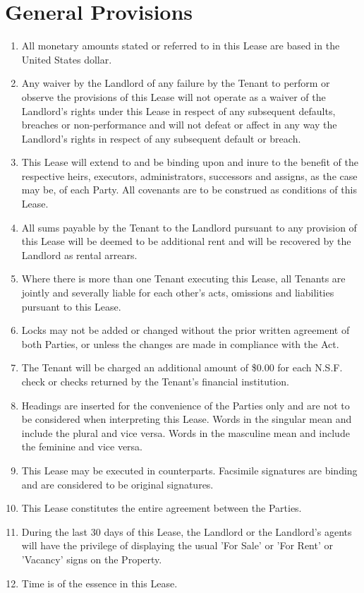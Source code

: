 \documentclass[12pt]{article}
\begin{document}
\section*{General Provisions}
\begin{enumerate}[resume]
    \item All monetary amounts stated or referred to in this Lease are based in
	    the United States dollar.
    \item Any waiver by the Landlord of any failure by the Tenant to perform or
	    observe the provisions of this Lease will not operate as a waiver
		of the Landlord's rights under this Lease in respect of any
		subsequent defaults, breaches or non-performance and will not
		defeat or affect in any way the Landlord's rights in respect of
		any subsequent default or breach.
    \item This Lease will extend to and be binding upon and inure to the
	    benefit of the respective heirs, executors, administrators,
		successors and assigns, as the case may be, of each Party. All
		covenants are to be construed as conditions of this Lease.
    \item All sums payable by the Tenant to the Landlord pursuant to any
	    provision of this Lease will be deemed to be additional rent and
		will be recovered by the Landlord as rental arrears.
    \item Where there is more than one Tenant executing this Lease, all Tenants
	    are jointly and severally liable for each other's acts, omissions
		and liabilities pursuant to this Lease.
    \item Locks may not be added or changed without the prior written agreement
	    of both Parties, or unless the changes are made in compliance with
		the Act.
    \item The Tenant will be charged an additional amount of \$0.00 for each
	    N.S.F. check or checks returned by the Tenant's financial
		institution.
    \item Headings are inserted for the convenience of the Parties only and are
	    not to be considered when interpreting this Lease. Words in the
		singular mean and include the plural and vice versa. Words in
		the masculine mean and include the feminine and vice versa.
    \item This Lease may be executed in counterparts. Facsimile signatures are
	    binding and are considered to be original signatures.
    \item This Lease constitutes the entire agreement between the Parties.
    \item During the last 30 days of this Lease, the Landlord or the Landlord's
	    agents will have the privilege of displaying the usual 'For Sale'
		or 'For Rent' or 'Vacancy' signs on the Property.
    \item Time is of the essence in this Lease.
\end{enumerate}
\end{document}
